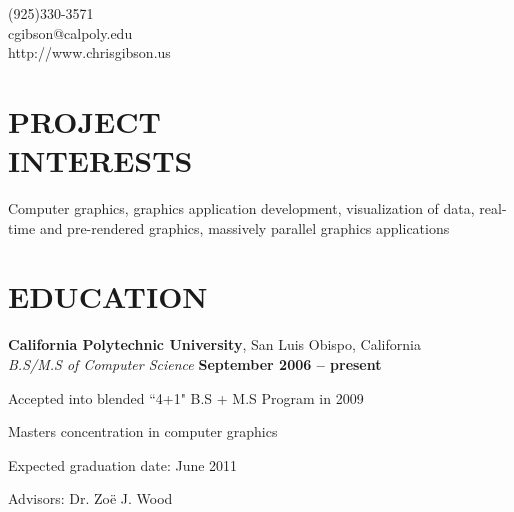 \documentclass[margin,line]{resume}
\begin{document}
{
	\sc
    \hfill (925)330-3571                  \vspace{0mm}\\\vspace{0mm}%
    \hfill cgibson@calpoly.edu            \vspace{0mm}\\\vspace{0mm}%
    \hfill http://www.chrisgibson.us      \vspace{0mm}\\\vspace{-10mm}%
}

\begin{resume}

\vspace{6mm}

    \section{\mysidestyle \textbf{\large{P}\small{ROJECT\\INTERESTS}}}

	Computer graphics, graphics application development, visualization of data, real-time and pre-rendered graphics, massively parallel graphics applications

\sectionline

    \section{\mysidestyle \textbf{\large{E}\small{DUCATION}}}

    \textbf{\listing California Polytechnic University}, San Luis Obispo, California \vspace{2mm}\\\vspace{1mm}%
    \textsl{B.S/M.S of Computer Science} \hfill \textbf{ September 2006 -- present}\vspace{-3mm}\\\vspace{-1mm}%
    \begin{list2}
    	\item Accepted into blended ``4+1" B.S + M.S Program in 2009
        \item Masters concentration in computer graphics
        \item Expected graduation date: June 2011
        \item Advisors:  Dr. Zo\"{e} J. Wood
    \end{list2}\vspace{-1.5mm}



\end{resume}
\end{document}
